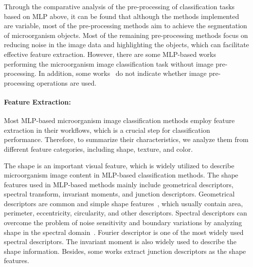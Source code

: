 Through the comparative analysis of the pre-processing of classification tasks based on MLP above, it can be found that although the methods implemented are variable, most of the pre-processing methods aim to achieve the segmentation of microorganism objects. Most of the remaining pre-processing methods focus on reducing noise in the image data and highlighting the objects, which can facilitate effective feature extraction. However, there are some MLP-based works~\cite{Balfoort-1992-AIAN,Rulaningtyas-2011-ACTB,Kiranyaz-2011-CRMI} performing the microorganism image classification task without image pre-processing. In addition, some works~\cite{Gerlach-1998-IRSM,Kay-1999-TAAS,Ginoris-2006-RPMU,Zeder-2010-AQAA} do not indicate whether image pre-processing operations are used.

\paragraph{\textbf{Feature Extraction:}}
Most MLP-based microorganism image classification methods employ feature extraction in their workflows, which is a crucial step for classification performance. Therefore, to summarize their characteristics, we analyze them from different feature categories, including shape, texture, and color.

The shape is an important visual feature, which is widely utilized to describe microorganism image content in MLP-based classification methods. The shape features used in MLP-based methods mainly include geometrical descriptors, spectral transform, invariant moments, and junction descriptors. Geometrical descriptors are common and simple shape features~\cite{Zhang-2004-RSRD}, which usually contain area, perimeter, eccentricity, circularity, and other descriptors. Spectral descriptors can overcome the problem of noise sensitivity and boundary variations by analyzing shape in the spectral domain~\cite{Zhang-2004-RSRD}. Fourier descriptor is one of the most widely used spectral descriptors. The invariant moment is also widely used to describe the shape information. Besides, some works extract junction descriptors as the shape features.

